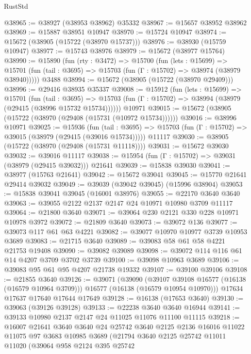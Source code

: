 \begin{lexlean}{RustStd}
\begin{coremodule}
@38965 := @38927 (@38953 @38962) @35332
@38967 := @15657 @38952 @38962
@38969 := @15887 @38951 @10947
@38970 := @15724 @10947
@38974 := @15672 (@38905 (@15722 (@38970 @15737)))
@38976 := @38930 (@15759 @10947)
@38977 := @15743 @38976
@38979 := @15672 (@38977 @15764)
@38990 := @15890
    (fun (rty : @3472) =>
    @15700
      (fun (lets : @15699) =>
      @15701 (fun (tail : @3695) => @15703 (fun (Γ : @15702) => @38974 (@38979 @38940)))))
    @3488
@38994 := @15672 (@38905 (@15722 (@38970 @29409)))
@38996 := @29416 @38935 @35337
@39008 := @15912
    (fun (lets : @15699) =>
    @15701
      (fun (tail : @3695) =>
      @15703 (fun (Γ : @15702) => @38994 (@38979 (@29415 (@38996 @15732 @15734))))))
    @10971
@39015 := @15672 (@38905 (@15722 (@38970 (@29408 (@15731 (@10972 @15734))))))
@39016 := @38996 @10971
@39025 := @15936
    (fun (tail : @3695) => @15703 (fun (Γ : @15702) => @39015 (@38979 (@29415 (@39016 @15734)))))
    @11117
@39030 := @38905 (@15722 (@38970 (@29408 (@15731 @11118))))
@39031 := @15672 @39030
@39032 := @39016 @11117
@39038 := @15954 (fun (Γ : @15702) => @39031 (@38979 (@29415 @39032))) @21641
@39039 := @15838 @39030
@39041 := @38977 (@15763 @21641)
@39042 := @15672 @39041
@39045 := @15770 @21641 @29414 @39032
@39049 := @39039 (@39042 @39045) (@15996 @38904)
@39053 := @15838 @39041 @39045 (@16001 @38976)
@39055 := @22170 @3640 @3640
@39063 := @39055 @2122 @2137 @2147 @24 @10971 @10980 @3709 @11117
@39064 := @21800 @3640
@39071 := @39064 @230 @2121 @330 @228 @10971 @10978 @3972
@39072 := @21809 @3640
@39073 := @39072 @136
@39077 := @39073 @117 @61 @63 @4221
@39082 := @39077 @10970 @10977 @3739 @10953 @3689
@39083 := @21715 @3640
@39089 := @39083 @58 @61 @58 @4221 @21753 @19408
@39090 := @39082 @39089
@39098 := @39072 @114 @116 @61 @14 @4207 @3709 @3702 @3739
@39100 := @39098 @10963 @3689
@39106 := @39083 @95 @61 @95 @4207 @21738 @19332
@39107 := @39100 @39106
@39108 := @21855 @3640
@39126 := @39071
    (@39090
      (@39107 @39108 @16577 (@16138 (@16579 @10964 @3709)))
      @16577
      (@16138 (@16579 @10954 @10970)))
    @17634
    @17637
    @17640
    @17644
    @17649
@39128 := @16138 (@17653 @3640)
@39130 := @39063 (@39126 @39128)
@39133 := @22238 @3640 @3640 @16944
@39141 := @39133 @10980 @2137 @2147 @24 @11025 @11076 @11100 @11115
@39218 := @16007
    @21641
    @3640
    @3640
    @24
    @25742
    @3640
    @2125
    @2136
    @16016
    @11022
    @11075
    @97
    @3683
    @10985
    @3689
    (@21794
      @3640
      @2125
      @25742
      @11011
      @11020
      (@39064
        @958
        @2124
        @395
        @25742

\end{coremodule}
\end{lexlean}
